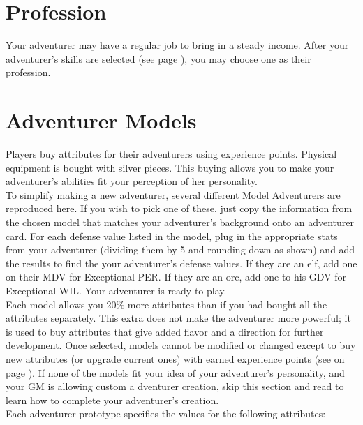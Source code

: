 \begin{multicols}{2}
\section{Profession}
Your adventurer may have a regular job to bring in a steady income. After your adventurer’s skills are selected (see page \textbf{\pageref{create-skills}}), you may choose one as their profession.
\section{Adventurer Models}
Players buy attributes for their adventurers using experience points. Physical equipment is bought with silver pieces. This buying allows you to make your adventurer’s abilities fit your perception of her personality.\\
To simplify making a new adventurer, several different Model Adventurers are reproduced here. If you wish to pick one of these, just copy the information from the chosen model that matches your adventurer’s background onto an adventurer card. For each defense value listed in the model, plug in the appropriate stats from your adventurer (dividing them by 5 and rounding down as shown) and add the results to find the your adventurer’s defense values. If they are an elf, add one on their MDV for Exceptional PER. If they are an orc, add one to his GDV for Exceptional WIL. Your adventurer is ready to play.\\
Each model allows you 20\% more attributes than if you had bought all the attributes separately. This extra does not make the adventurer more powerful; it is used to buy attributes that give added flavor and a direction for further development. Once selected, models cannot be modified or changed except to buy new attributes (or upgrade current ones) with earned experience points (see  on page \textbf{\pageref{create-buying}}).
If none of the models fit your idea of your adventurer’s personality, and your GM is allowing custom a dventurer creation, skip this section and read  to learn how to complete your adventurer’s creation.\\
Each adventurer prototype specifies the values for the following attributes:
\end{multicols}
